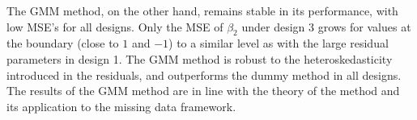 The GMM method, on the other hand, remains stable in its performance, with low MSE's for all designs.
Only the MSE of $\beta_2$ under design 3 grows for values at the boundary (close to $1$ and $-1$) to a similar level as with the large residual parameters in design 1.
The GMM method is robust to the heteroskedasticity introduced in the residuals, and outperforms the dummy method in all designs.
The results of the GMM method are in line with the theory of the method and its application to the missing data framework.
